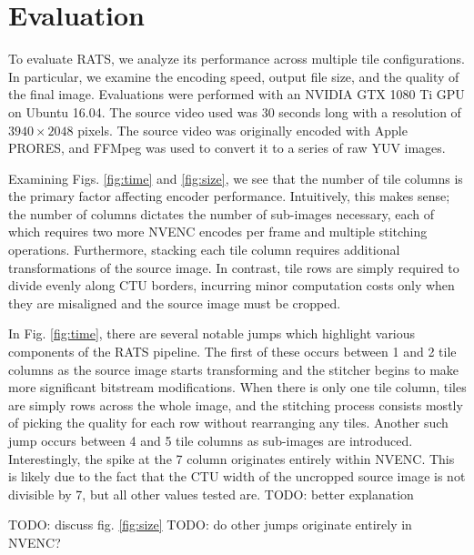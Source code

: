 \section{Evaluation}
To evaluate RATS, we analyze its performance across multiple tile configurations. In particular, we examine the encoding speed, output file size, and the quality of the final image. Evaluations were performed with an NVIDIA GTX 1080 Ti GPU on Ubuntu 16.04. The source video used was 30 seconds long with a resolution of $3940\times2048$ pixels. The source video was originally encoded with Apple PRORES, and FFMpeg was used to convert it to a series of raw YUV images.

Examining Figs. \ref{fig:time} and \ref{fig:size}, we see that the number of tile columns is the primary factor affecting encoder performance. Intuitively, this makes sense; the number of columns dictates the number of sub-images necessary, each of which requires two more NVENC encodes per frame and multiple stitching operations. Furthermore, stacking each tile column requires additional transformations of the source image. In contrast, tile rows are simply required to divide evenly along CTU borders, incurring minor computation costs only when they are misaligned and the source image must be cropped.

In Fig. \ref{fig:time}, there are several notable jumps which highlight various components of the RATS pipeline. The first of these occurs between 1 and 2 tile columns as the source image starts transforming and the stitcher begins to make more significant bitstream modifications. When there is only one tile column, tiles are simply rows across the whole image, and the stitching process consists mostly of picking the quality for each row without rearranging any tiles. Another such jump occurs between 4 and 5 tile columns as sub-images are introduced. Interestingly, the spike at the 7 column originates entirely within NVENC. This is likely due to the fact that the CTU width of the uncropped source image is not divisible by 7, but all other values tested are. TODO: better explanation

TODO: discuss fig. \ref{fig:size}
TODO: do other jumps originate entirely in NVENC?






